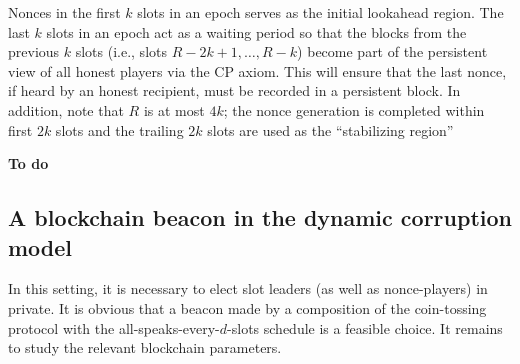 \begin{remark}
Nonces in the first $k$ slots in an epoch serves as the initial lookahead region. 
The last $k$ slots in an epoch act as a waiting period so that 
the blocks from the previous $k$ slots (i.e., slots $R - 2k+1, \ldots, R-k$) 
become part of the persistent view of all honest players via the CP axiom. 
This will ensure that the last nonce, if heard by an honest recipient, 
must be recorded in a persistent block. 
In addition, note that $R$ is at most $4k$; 
the nonce generation is completed within first $2k$ slots
and the trailing $2k$ slots are used as the ``stabilizing region''
\end{remark}

\textbf{To do}




\subsection{A blockchain beacon in the dynamic corruption model}
In this setting, it is necessary to elect slot leaders (as well as nonce-players) in private. 
It is obvious that a beacon made by a composition of the coin-tossing protocol 
with the all-speaks-every-$d$-slots schedule is a feasible choice. 
It remains to study the relevant blockchain parameters.




